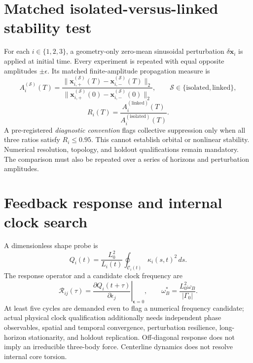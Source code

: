 \documentclass[11pt,a4paper]{article}
\begin{document}
\section{Matched isolated-versus-linked stability test}
For each $i\in\{1,2,3\}$, a geometry-only zero-mean sinusoidal perturbation $\delta\mathbf x_i$ is applied at initial time. Every experiment is repeated with equal opposite amplitudes $\pm\epsilon$. Its matched finite-amplitude propagation measure is
\begin{equation}
A_i^{(\mathcal S)}(T)=
\frac{\lVert\mathbf x_{i,+}^{(\mathcal S)}(T)-\mathbf x_{i,-}^{(\mathcal S)}(T)\rVert_2}
{\lVert\mathbf x_{i,+}^{(\mathcal S)}(0)-\mathbf x_{i,-}^{(\mathcal S)}(0)\rVert_2},\qquad
\mathcal S\in\{\mathrm{isolated},\mathrm{linked}\},
\end{equation}
\begin{equation}
R_i(T)=\frac{A_i^{(\mathrm{linked})}(T)}{A_i^{(\mathrm{isolated})}(T)}.
\end{equation}
A pre-registered \emph{diagnostic convention} flags collective suppression only when all three ratios satisfy $R_i\le 0.95$. This cannot establish orbital or nonlinear stability. Numerical resolution, topology, and holdout qualifications remain mandatory. The comparison must also be repeated over a series of horizons and perturbation amplitudes.
\section{Feedback response and internal clock search}
A dimensionless shape probe is
\begin{equation}
Q_i(t)=\frac{L_0^2}{L_i(t)}\oint_{\mathcal C_i(t)}\kappa_i(s,t)^2\,ds.
\end{equation}
The response operator and a candidate clock frequency are
\begin{equation}
\mathcal R_{ij}(\tau)=\left.\frac{\partial Q_i(t+\tau)}{\partial\epsilon_j}\right|_{\boldsymbol\epsilon=0},\qquad
\omega_B^*=\frac{L_0^2\omega_B}{|\Gamma_0|}.
\end{equation}
At least five cycles are demanded even to flag a numerical frequency candidate; actual physical clock qualification additionally needs independent phase observables, spatial and temporal convergence, perturbation resilience, long-horizon stationarity, and holdout replication. Off-diagonal response does not imply an irreducible three-body force. Centerline dynamics does not resolve internal core torsion.
\end{document}
